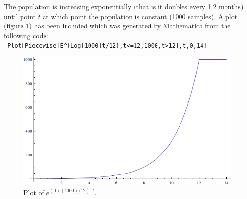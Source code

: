 \begin{enumerate}
  The population is increasing exponentially (that is it doubles every 1.2
  months) until point $t$ at which point the population is constant (1000
  samples). A plot (figure \ref{fig:q5plot}) has been included which was
  generated by Mathematica from the following code:\\
  \texttt{
  Plot[Piecewise[{{E\^{}(Log[1000]t/12),t<=12},{1000,t>12}}],{t,0,14}]
  }
  \begin{figure}[!h]
    \centering
    \includegraphics[width=\linewidth]{solutions/q5/q5plot.png}
  \caption{Plot of $e^{ (\ln(1000)/12)\cdot t}$.}
  \label{fig:q5plot}
  \end{figure}
\end{enumerate}\qedbitches
